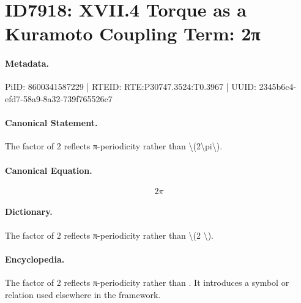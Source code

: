 \section*{ID7918: XVII.4 Torque as a Kuramoto Coupling Term: 2π}
\paragraph{Metadata.}
PiID: 8600341587229 | RTEID: RTE:P30747.3524:T0.3967 | UUID: 2345b6c4-efd7-58a9-8a32-739f765526c7

\paragraph{Canonical Statement.}
The factor of 2 reflects π-periodicity rather than \textbackslash{}(2\textbackslash{}pi\textbackslash{}).

\paragraph{Canonical Equation.}
\[
2\pi
\]

\paragraph{Dictionary.}
The factor of 2 reflects π-periodicity rather than \textbackslash{}(2 \textbackslash{}).

\paragraph{Encyclopedia.}
The factor of 2 reflects π-periodicity rather than . It introduces a symbol or relation used elsewhere in the framework.
